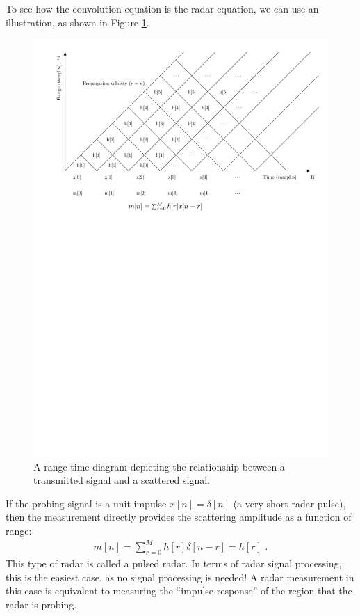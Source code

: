 To see how the convolution equation is the radar equation, we can use
an illustration, as shown in Figure \ref{fig:range_time_diagram}.
\begin{figure}
\begin{center}
\includegraphics[width=\textwidth]{ch10/figures/rd.pdf}
\end{center}
\caption{A range-time diagram depicting the relationship between a transmitted signal and a scattered signal.}
\label{fig:range_time_diagram}
\end{figure}

If the probing signal is a unit impulse $x[n]=\delta[n]$ (a very short
radar pulse), then the measurement directly provides the scattering
amplitude as a function of range:
\begin{align}
m[n] = \sum_{r=0}^M h[r]\delta[n-r] = h[r]\,\,.
\end{align}
This type of radar is called a pulsed radar. In terms of radar
signal processing, this is the easiest case, as no signal processing
is needed! A radar measurement in this case is equivalent to measuring
the ``impulse response'' of the region that the radar is probing.

